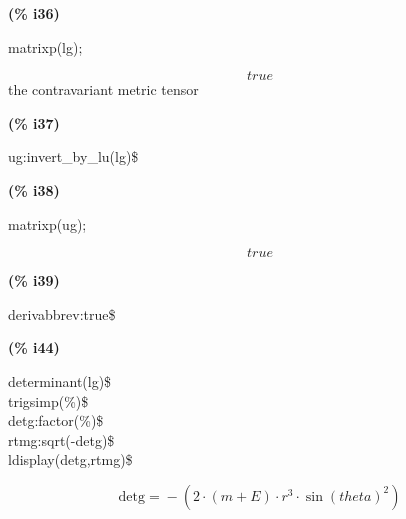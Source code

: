 \documentclass[fleqn]{article}
\begin{document}
\noindent
\begin{minipage}[t]{4.000000em}\color{red}\bfseries
(\% i36)	
\end{minipage}
\begin{minipage}[t]{\textwidth}\color{blue}
matrixp(lg);
\end{minipage}
\[\displaystyle \tag{\% o36} 
true\mbox{}
\]
the contravariant metric tensor


\noindent
\begin{minipage}[t]{4.000000em}\color{red}\bfseries
(\% i37)	
\end{minipage}
\begin{minipage}[t]{\textwidth}\color{blue}
ug:invert\_by\_lu(lg)\$
\end{minipage}

\noindent%



\noindent
\begin{minipage}[t]{4.000000em}\color{red}\bfseries
(\% i38)	
\end{minipage}
\begin{minipage}[t]{\textwidth}\color{blue}
matrixp(ug);
\end{minipage}
\[\displaystyle \tag{\% o38} 
true\mbox{}
\]


\noindent
\begin{minipage}[t]{4.000000em}\color{red}\bfseries
(\% i39)	
\end{minipage}
\begin{minipage}[t]{\textwidth}\color{blue}
derivabbrev:true\$
\end{minipage}

\noindent%



\noindent
\begin{minipage}[t]{4.000000em}\color{red}\bfseries
(\% i44)	
\end{minipage}
\begin{minipage}[t]{\textwidth}\color{blue}
determinant(lg)\$\\
trigsimp(\%)\$\\
detg:factor(\%)\$\\
rtmg:sqrt(-detg)\$\\
ldisplay(detg,rtmg)\$
\end{minipage}
\[\displaystyle \tag{\% t44} 
\ensuremath{\mathrm{detg}}\mathop{=}\mathop{-}\left( 2\mathop{\ensuremath{\cdot}}\left( m\mathop{+}E\right) \mathop{\ensuremath{\cdot}}{{r}^{3}}\mathop{\ensuremath{\cdot}}{{\sin{(theta)}}^{2}}\right) \mbox{}\]
\end{document}
